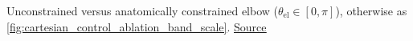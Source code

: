Unconstrained versus anatomically constrained elbow ($\theta_\mathrm{el} \in [0, \pi]$), otherwise as \autoref{fig:cartesian_control_ablation_band_scale}. \href{https://github.com/tahmidazam/gg4/blob/main/notebooks/cartesian_control_ablation_elbow/cartesian_control_ablation_elbow.ipynb}{\underline{Source}}%